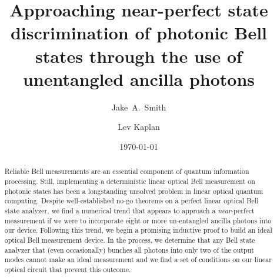 \documentclass[aps,pra,twocolumn,showpacs,superscriptaddress,floatfix,10pt]{revtex4}
\begin{document}
\newcommand{\beq}{\begin{equation}}
\newcommand{\eeq}{\end{equation}}
\newcommand{\ben}{\begin{eqnarray}}
\newcommand{\een}{\end{eqnarray}}
\newcommand{\bea}{\begin{array}}
\newcommand{\eea}{\end{array}}
\newcommand{\om}{(\omega )}
\newcommand{\bef}{\begin{figure}}
\newcommand{\eef}{\end{figure}}
\newcommand{\leg}[1]{\caption{\protect\rm{\protect\footnotesize{#1}}}}
\newcommand{\ew}[1]{\langle{#1}\rangle}
\newcommand{\be}[1]{\mid\!{#1}\!\mid}
\newcommand{\no}{\nonumber}
\newcommand{\etal}{{\em et~al }}
\newcommand{\geff}{g_{\mbox{\it{\scriptsize{eff}}}}}
\newcommand{\da}[1]{{#1}^\dagger}
\newcommand{\cf}{{\it cf.\/}\ }
\newcommand{\ie}{{\it i.e.\/}\ }   

\newcommand{\spazio}{\vspace{0.3cm}}%
\newcommand{\de}[1]{\frac{\partial}{\partial{#1}}}
\newcommand{\U}{\tilde{U}}
\newcommand{\V}{\tilde{V}}


\title{Approaching near-perfect state discrimination of photonic Bell states through the use of unentangled ancilla photons}

\author{Jake~A.~Smith}

\author{Lev Kaplan}

 \begin{abstract}
 	Reliable Bell measurements are an essential component of quantum information processing. Still, implementing a deterministic linear optical Bell measurement on photonic states has been a longstanding unsolved problem in linear optical quantum computing. Despite well-established no-go theorems on a perfect linear optical Bell state analyzer, we find a numerical trend that appears to approach a \textit{near}-perfect measurement if we were to incorporate eight or more un-entangled ancilla photons into our device. Following this trend, we begin a promising inductive proof to build an ideal optical Bell measurement device. In the process, we determine that any Bell state analyzer that (even occasionally) bunches all photons into only two of the output modes cannot make an ideal measurement and we find a set of conditions on our linear optical circuit that prevent this outcome.
\end{abstract}                                                               
\date{\today}
\maketitle
\end{document}
